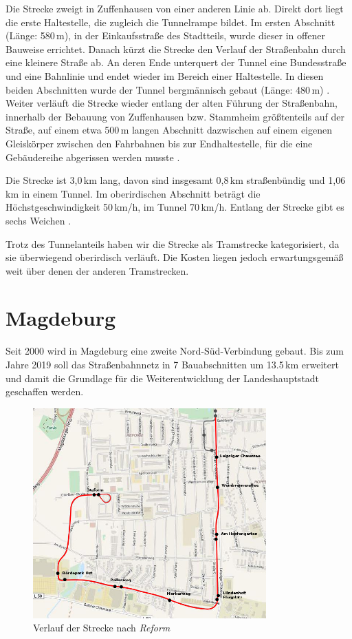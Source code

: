 Die Strecke zweigt in Zuffenhausen von einer anderen Linie ab. Direkt dort liegt die erste Haltestelle, die zugleich die Tunnelrampe bildet. Im ersten Abschnitt (Länge: 580\,m), in der Einkaufsstraße des Stadtteils, wurde dieser in offener Bauweise errichtet.
Danach kürzt die Strecke den Verlauf der Straßenbahn durch eine kleinere Straße ab. An deren Ende unterquert der Tunnel eine Bundesstraße und eine Bahnlinie und endet wieder im Bereich einer Haltestelle. In diesen beiden Abschnitten wurde der Tunnel bergmännisch gebaut (Länge: 480\,m) \cite{u15mail} \cite{u15sv} \cite{u15nplan}.
Weiter verläuft die Strecke wieder entlang der alten Führung der Straßenbahn, innerhalb der Bebauung von Zuffenhausen bzw. Stammheim größtenteils auf der Straße, auf einem etwa 500\,m langen Abschnitt dazwischen auf einem eigenen Gleiskörper zwischen den Fahrbahnen \cite{u15nplan} bis zur Endhaltestelle, für die eine Gebäudereihe abgerissen werden musste \cite{u15sv}.

Die Strecke ist 3,0\,km lang, davon sind insgesamt 0,8\,km straßenbündig und 1,06\,km in einem Tunnel.
Im oberirdischen Abschnitt beträgt die Höchst\-ge\-schwin\-dig\-keit 50\,km/h, im Tunnel 70\,km/h.
Entlang der Strecke gibt es sechs Weichen \cite{u15mail}.

Trotz des Tunnelanteils haben wir die Strecke als Tramstrecke kategorisiert, da sie überwiegend oberirdisch verläuft. Die Kosten liegen jedoch erwartungsgemäß weit über denen der anderen Tramstrecken.

\section{Magdeburg}

Seit 2000 wird in Magdeburg eine zweite Nord-Süd-Verbindung
gebaut. Bis zum Jahre 2019 soll das Straßenbahnnetz in 7
Bauabschnitten um 13.5\,km erweitert und damit die Grundlage
für die Weiterentwicklung der Landeshauptstadt geschaffen
werden. \cite{mvbNordSued}

\begin{figure}[h]
  \begin{center}
    \includegraphics[width=0.8\textwidth]{maps/Magdeburg.png}
    \caption{Verlauf der Strecke nach \textit{Reform}}
  \end{center}
\end{figure}

